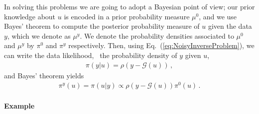 In solving this problems we are going to adopt a Bayesian point of view; our
prior knowledge about $u$ is encoded in a prior probability measure
$\mu^0$, and we use Bayes' theorem to compute the posterior
probability measure of $u$ given the data $y$, which we denote as
$\mu^y$. We denote the probability densities associated to $\mu^0$ and
$\mu^y$ by $\pi^0$ and $\pi^y$ respectively. Then, using
Eq.~(\ref{eq:NoisyInverseProblem}), we can write the data likelihood,
\ie\ the probability density of $y$ given $u$,
\begin{align}
  \label{eq:YGivenUProbDensity}
  \pi(y|u) = \rho(y-\mathcal G(u))\, ,
\end{align}
and Bayes' theorem yields
\begin{align}
  \label{eq:BayesThmInversePosterior}
  \pi^y(u) = \pi(u|y) \propto \rho(y-\mathcal G(u)) \pi^0(u)\, .
\end{align}

\paragraph{Example}

